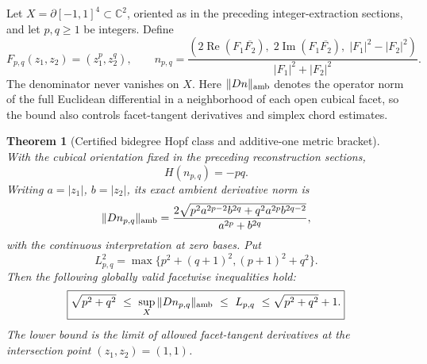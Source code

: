 \documentclass[aps,prd,onecolumn,notitlepage,11pt,superscriptaddress,longbibliography]{revtex4-2}
\newtheorem{theorem}{Theorem}
\begin{document}
Let $X=\partial[-1,1]^4\subset\mathbb C^2$, oriented as in the preceding integer-extraction sections, and let $p,q\ge1$ be integers. Define
\begin{equation}\label{eq:v12-bidegree}
 F_{p,q}(z_1,z_2)=(z_1^p,z_2^q),\qquad
 n_{p,q}=\frac{(2\operatorname{Re}(F_1\overline{F_2}),\;2\operatorname{Im}(F_1\overline{F_2}),\;|F_1|^2-|F_2|^2)}{|F_1|^2+|F_2|^2}.
\end{equation}
The denominator never vanishes on $X$. Here $\|Dn\|_{\rm amb}$ denotes the operator norm of the full Euclidean differential in a neighborhood of each open cubical facet, so the bound also controls facet-tangent derivatives and simplex chord estimates.

\begin{theorem}[Certified bidegree Hopf class and additive-one metric bracket]\label{th:v12-bidegree}
With the cubical orientation fixed in the preceding reconstruction sections,
\begin{equation}\label{eq:v12-class}
\boxed{\quad H(n_{p,q})=-pq.\quad}
\end{equation}
Writing $a=|z_1|$, $b=|z_2|$, its exact ambient derivative norm is
\begin{equation}\label{eq:v12-wronskian}
\|Dn_{p,q}\|_{\rm amb}=
\frac{2\sqrt{p^2a^{2p-2}b^{2q}+q^2a^{2p}b^{2q-2}}}{a^{2p}+b^{2q}},
\end{equation}
with the continuous interpretation at zero bases. Put
\begin{equation}\label{eq:v12-L}
 L_{p,q}^2=\max\{p^2+(q+1)^2,(p+1)^2+q^2\}.
\end{equation}
Then the following \emph{globally valid facetwise} inequalities hold:
\begin{equation}\label{eq:v12-nearsharp}
\boxed{\sqrt{p^2+q^2}\ \le\ \sup_X\|Dn_{p,q}\|_{\rm amb}\ \le\ L_{p,q}\ \le\sqrt{p^2+q^2}+1.}
\end{equation}
The lower bound is the limit of allowed facet-tangent derivatives at the intersection point $(z_1,z_2)=(1,1)$.
\end{theorem}
\end{document}
